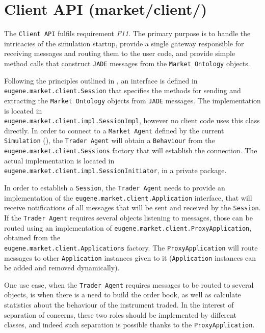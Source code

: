 \section{Client API (market/client/)}
\label{Chapters/Implementation/Client-API}
The \texttt{Client API} fulfils requirement \textit{F11}. The primary purpose is to handle the intricacies of the simulation startup, provide  a single gateway responsible for receiving messages and routing them to the user code, and provide simple method calls that construct \texttt{JADE} messages from the \texttt{Market Ontology} objects.

Following the principles outlined in , an interface is defined in \\ \texttt{eugene.market.client.Session} that specifies the methods for sending   and extracting the \texttt{Market Ontology} objects from \texttt{JADE} messages. The implementation is located in \\\texttt{eugene.market.client.impl.SessionImpl}, however no client code uses this class directly. In order to connect to a \texttt{Market Agent} defined by the current \texttt{Simulation} (), the \texttt{Trader Agent} will obtain a \texttt{Behaviour} from the \\ \texttt{eugene.market.client.Sessions} factory that will establish the connection. The actual implementation is located in \texttt{eugene.market.client.impl.SessionInitiator}, in a private package. 

In order to establish a \texttt{Session}, the \texttt{Trader Agent} needs to provide an implementation of the \texttt{eugene.market.client.Application} interface, that will receive notifications of all messages that will be sent and received by the \texttt{Session}. If the \texttt{Trader Agent} requires several objects listening to messages, those can be routed using an implementation of \texttt{eugene.market.client.ProxyApplication}, obtained from the \\\texttt{eugene.market.client.Applications} factory. The \texttt{ProxyApplication} will route messages to other \texttt{Application} instances given to it (\texttt{Application} instances can be added and removed dynamically).

One use case, when the \texttt{Trader Agent} requires messages to be routed to several objects, is when there is a need to build the order book, as well as calculate statistics about the behaviour of the instrument traded. In the interest of separation of concerns, these two roles should be implemented by different classes, and indeed such separation is possible thanks to the \texttt{ProxyApplication}.

